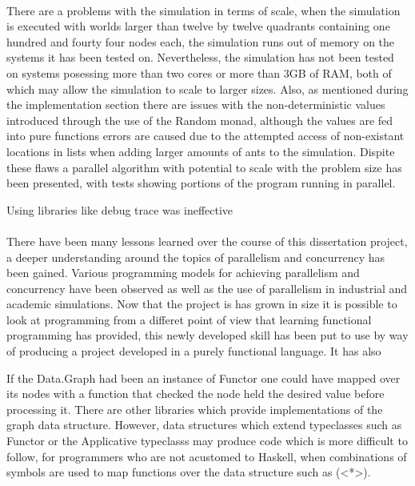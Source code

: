 \documentclass[main.tex]{subfiles}
\begin{document}
\paragraph{}There are a problems with the simulation in terms of scale, when the simulation is executed with worlds larger than twelve by twelve quadrants containing one hundred and fourty four nodes each, the simulation runs out of memory on the systems it has been tested on. Nevertheless, the simulation has not been tested on systems posessing more than two cores or more than 3GB of RAM, both of which may allow the simulation to scale to larger sizes. Also, as mentioned during the implementation section there are issues with the non-deterministic values introduced through the use of the Random monad, although the values are fed into pure functions errors are caused due to the attempted access of non-existant locations in lists when adding larger amounts of ants to the simulation. Dispite these flaws a parallel algorithm with potential to scale with the problem size has been presented, with tests showing portions of the program running in parallel.




Using libraries like debug trace was ineffective

\paragraph{}There have been many lessons learned over the course of this dissertation project, a deeper understanding around the topics of  parallelism and concurrency has been gained. Various programming models for achieving parallelism and concurrency have been observed as well as the use of parallelism in industrial and academic simulations. Now that the project is has grown in size it is possible to look at programming from a differet point of view that learning functional programming has provided, this newly developed skill has been put to use by way of producing a project developed in a purely functional language. It has also

If the Data.Graph had been an instance of Functor one could have mapped over its nodes with a function that checked the node held the desired value before processing it. There are other libraries which provide implementations of the graph data structure. However, data structures which extend typeclasses such as Functor or the Applicative typeclasss may produce code which is more difficult to follow, for programmers who are not acustomed to Haskell, when combinations of symbols are used to map functions over the data structure such as (<*>). 
\end{document}
